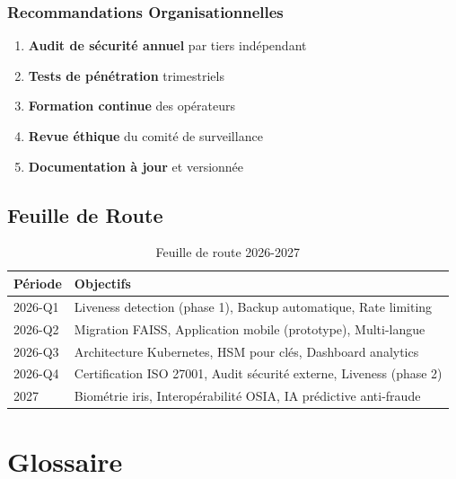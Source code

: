 \documentclass[12pt,a4paper]{report}
\begin{document}
\subsection{Recommandations Organisationnelles}

\begin{enumerate}
    \item \textbf{Audit de sécurité annuel} par tiers indépendant
    \item \textbf{Tests de pénétration} trimestriels
    \item \textbf{Formation continue} des opérateurs
    \item \textbf{Revue éthique} du comité de surveillance
    \item \textbf{Documentation à jour} et versionnée
\end{enumerate}

\section{Feuille de Route}

\begin{table}[H]
    \centering
    \caption{Feuille de route 2026-2027}
    \label{tab:roadmap}
    \begin{tabular}{|l|p{10cm}|}
        \hline
        \textbf{Période} & \textbf{Objectifs} \\
        \hline
        2026-Q1 & Liveness detection (phase 1), Backup automatique, Rate limiting \\
        \hline
        2026-Q2 & Migration FAISS, Application mobile (prototype), Multi-langue \\
        \hline
        2026-Q3 & Architecture Kubernetes, HSM pour clés, Dashboard analytics \\
        \hline
        2026-Q4 & Certification ISO 27001, Audit sécurité externe, Liveness (phase 2) \\
        \hline
        2027 & Biométrie iris, Interopérabilité OSIA, IA prédictive anti-fraude \\
        \hline
    \end{tabular}
\end{table}

\appendix

\chapter{Glossaire}
\end{document}
